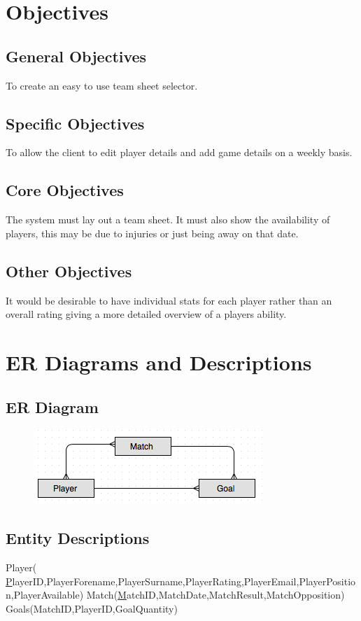 \section{Objectives}

\subsection{General Objectives}
To create an easy to use team sheet selector.
\subsection{Specific Objectives}
To allow the client to edit player details and add game details on a weekly basis.
\subsection{Core Objectives}
The system must lay out a team sheet. It must also show the availability of players, this may be due to injuries or just being away on that date.     
\subsection{Other Objectives}
It would be desirable to have individual stats for each player rather than an overall rating giving a more detailed overview of a players ability.
\section{ER Diagrams and Descriptions}

\subsection{ER Diagram}
\begin{figure}[H]
	\includegraphics{ER}
\end{figure}

\subsection{Entity Descriptions}
Player( {\ul PlayerID},PlayerForename,PlayerSurname,PlayerRating,PlayerEmail,PlayerPosition,PlayerAvailable)
Match({\ul MatchID},MatchDate,MatchResult,MatchOpposition)
Goals(MatchID,PlayerID,GoalQuantity)
